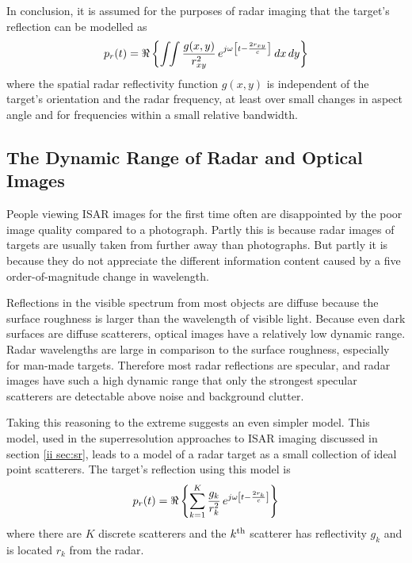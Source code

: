 In conclusion, it is assumed for the purposes of radar imaging that the 
target's reflection can be modelled as
\begin{equation}\label{hrr eqn:2D pr(t)}
p_r(t)=\Re\left\{\int\!\!\int\frac{g(x,y)}{r_{xy}^2}\,
e^{j\omega\left[t-\frac{2r_{xy}}{c}\right]}\,dx\,dy\right\}
\end{equation}
where the spatial radar reflectivity function $g(x,y)$ is independent of the
target's orientation and the radar frequency, at least over small changes in
aspect angle and for frequencies within a small relative bandwidth.


\subsection{The Dynamic Range of Radar and Optical Images}


People viewing ISAR images for the first time often are disappointed by the
poor image quality compared to a photograph.  Partly this is because radar
images of targets are usually taken from further away than photographs.  But
partly it is because they do not appreciate the different information
content caused by a five order-of-magnitude change in wavelength.

Reflections in the visible spectrum from most objects are diffuse because
the surface roughness is larger than the wavelength of visible light.
Because even dark surfaces are diffuse scatterers, optical images have a
relatively low dynamic range.  Radar wavelengths are large in comparison to
the surface roughness, especially for man-made targets.  Therefore most
radar reflections are specular, and radar images have such a high dynamic
range that only the strongest specular scatterers are detectable above 
noise and background clutter.

Taking this reasoning to the extreme suggests an even simpler model.  This
model, used in the superresolution approaches to ISAR imaging discussed in 
section \ref{ii sec:sr}, leads to a model of a radar target as a small
collection of ideal point scatterers.  The target's reflection using this 
model is
\begin{equation}\label{hrr eqn:pt sc pr(t)}
p_r(t)=\Re\left\{\sum_{k=1}^K \frac{g_k}{r_k^2}\,
e^{j\omega\left[t-\frac{2r_k}{c}\right]}\right\}
\end{equation}
where there are $K$ discrete scatterers and the $k^{\rm th}$ scatterer has
reflectivity $g_k$ and is located $r_k$ from the radar.


